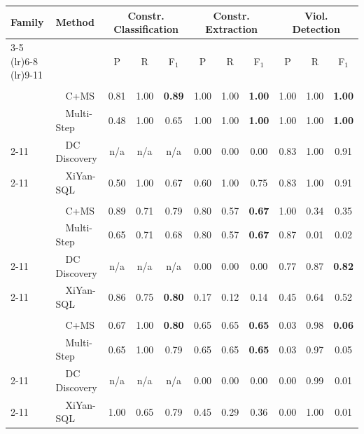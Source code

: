\begin{tabular}{llccccccccc}
\toprule
\textbf{Family} & \textbf{Method} & \multicolumn{3}{c}{Constr. Classification} & \multicolumn{3}{c}{Constr. Extraction} & \multicolumn{3}{c}{Viol. Detection} \\
\cmidrule(lr){3-5}  \cmidrule(lr){6-8}  \cmidrule(lr){9-11}
 &  & P & R & F$_1$ & P & R & F$_1$ & P & R & F$_1$ \\
\midrule
\addlinespace[2pt]
\multicolumn{11}{c}{\textbf{Hospital}} \\
\addlinespace[1pt]
\multirow{2}{*}{\system} & ~~C+MS & 0.81 & 1.00 & \textbf{0.89} & 1.00 & 1.00 & \textbf{1.00} & 1.00 & 1.00 & \textbf{1.00} \\
 & ~~Multi-Step & 0.48 & 1.00 & 0.65 & 1.00 & 1.00 & \textbf{1.00} & 1.00 & 1.00 & \textbf{1.00} \\
\cmidrule(l){2-11}
\multirow{1}{*}{Profiling} & ~~DC Discovery & n/a & n/a & n/a & 0.00 & 0.00 & 0.00 & 0.83 & 1.00 & 0.91 \\
\cmidrule(l){2-11}
\multirow{1}{*}{Text2SQL} & ~~XiYan-SQL & 0.50 & 1.00 & 0.67 & 0.60 & 1.00 & 0.75 & 0.83 & 1.00 & 0.91 \\
\midrule
\addlinespace[2pt]
\multicolumn{11}{c}{\textbf{Restaurant}} \\
\addlinespace[1pt]
\multirow{2}{*}{\system} & ~~C+MS & 0.89 & 0.71 & 0.79 & 0.80 & 0.57 & \textbf{0.67} & 1.00 & 0.34 & 0.35 \\
 & ~~Multi-Step & 0.65 & 0.71 & 0.68 & 0.80 & 0.57 & \textbf{0.67} & 0.87 & 0.01 & 0.02 \\
\cmidrule(l){2-11}
\multirow{1}{*}{Profiling} & ~~DC Discovery & n/a & n/a & n/a & 0.00 & 0.00 & 0.00 & 0.77 & 0.87 & \textbf{0.82} \\
\cmidrule(l){2-11}
\multirow{1}{*}{Text2SQL} & ~~XiYan-SQL & 0.86 & 0.75 & \textbf{0.80} & 0.17 & 0.12 & 0.14 & 0.45 & 0.64 & 0.52 \\
\midrule
\addlinespace[2pt]
\multicolumn{11}{c}{\textbf{SISU}} \\
\addlinespace[1pt]
\multirow{2}{*}{\system} & ~~C+MS & 0.67 & 1.00 & \textbf{0.80} & 0.65 & 0.65 & \textbf{0.65} & 0.03 & 0.98 & \textbf{0.06} \\
 & ~~Multi-Step & 0.65 & 1.00 & 0.79 & 0.65 & 0.65 & \textbf{0.65} & 0.03 & 0.97 & 0.05 \\
\cmidrule(l){2-11}
\multirow{1}{*}{Profiling} & ~~DC Discovery & n/a & n/a & n/a & 0.00 & 0.00 & 0.00 & 0.00 & 0.99 & 0.01 \\
\cmidrule(l){2-11}
\multirow{1}{*}{Text2SQL} & ~~XiYan-SQL & 1.00 & 0.65 & 0.79 & 0.45 & 0.29 & 0.36 & 0.00 & 1.00 & 0.01 \\

\end{tabular}
